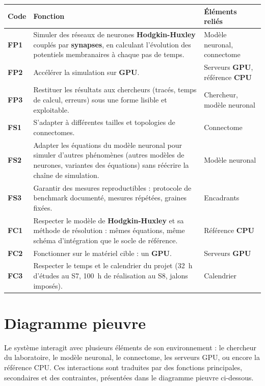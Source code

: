 {\small
\begin{longtable}{|p{0.9cm}|p{8.6cm}|p{2.7cm}|}
\hline
\rowcolor{gray!15} \textbf{Code} & \textbf{Fonction} & \textbf{Éléments reliés} \\ \hline
\endhead
\rowcolor{whybg} \textbf{FP1} & Simuler des réseaux de neurones \textbf{Hodgkin-Huxley} couplés par \textbf{synapses}, en calculant l'évolution des potentiels membranaires à chaque pas de temps. & Modèle neuronal, connectome \\ \hline
\rowcolor{whybg} \textbf{FP2} & Accélérer la simulation sur \textbf{GPU}. & Serveurs \textbf{GPU}, référence \textbf{CPU} \\ \hline
\rowcolor{whybg} \textbf{FP3} & Restituer les résultats aux chercheurs (tracés, temps de calcul, erreurs) sous une forme lisible et exploitable. & Chercheur, modèle neuronal \\ \hline
\rowcolor{whatbg} \textbf{FS1} & S'adapter à différentes tailles et topologies de connectomes. & Connectome  \\ \hline
\rowcolor{whatbg} \textbf{FS2} & Adapter les équations du modèle neuronal pour simuler d'autres phénomènes (autres modèles de neurones, variantes des équations) sans réécrire la chaîne de simulation. & Modèle neuronal  \\ \hline
\rowcolor{whatbg} \textbf{FS3} & Garantir des mesures reproductibles : protocole de benchmark documenté, mesures répétées, graines fixées. & Encadrants  \\ \hline
\rowcolor{defibg} \textbf{FC1} & Respecter le modèle de \textbf{Hodgkin-Huxley} et sa méthode de résolution : mêmes équations, même schéma d'intégration que le socle de référence. & Référence \textbf{CPU} \\ \hline
\rowcolor{defibg} \textbf{FC2} & Fonctionner sur le matériel cible : un \textbf{GPU}. & Serveurs \textbf{GPU} \\ \hline
\rowcolor{defibg} \textbf{FC3} & Respecter le temps et le calendrier du projet (32~h d'études au S7, 100~h de réalisation au S8, jalons imposés). & Calendrier \\ \hline
\end{longtable}}

\section{Diagramme pieuvre}

Le système interagit avec plusieurs éléments de son environnement : le chercheur du laboratoire, le modèle neuronal, le connectome, les serveurs GPU, ou encore la référence CPU. Ces interactions sont traduites par des fonctions principales, secondaires et des contraintes, présentées dans le diagramme pieuvre ci-dessous.

